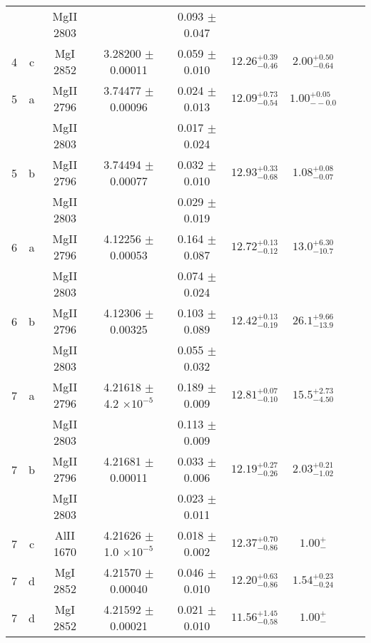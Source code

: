 \documentclass[12pt]{article}
\begin{document}
\begin{footnotesize}
\begin{longtable}{ c c c c c c c c c}
  &   & MgII     2803  &  &  0.093 $\pm$ 0.047   &   &     & 	 & \\ 
       4  & c  & MgI     2852  &  3.28200 $\pm$ 0.00011  &  0.059 $\pm$ 0.010   & $12.26_{ - 0.46}^{ + 0.39}$  & $2.00_{ - 0.64}^{ + 0.50}$    & 	 & \\ 
       5  & a  & MgII     2796  &  3.74477 $\pm$ 0.00096  &  0.024 $\pm$ 0.013   & $12.09_{ - 0.54}^{ + 0.73}$  & $1.00_{ - -0.0}^{ + 0.05}$    & 	 & \\ 
  &   & MgII     2803  &  &  0.017 $\pm$ 0.024   &   &     & 	 & \\ 
       5  & b  & MgII     2796  &  3.74494 $\pm$ 0.00077  &  0.032 $\pm$ 0.010   & $12.93_{ - 0.68}^{ + 0.33}$  & $1.08_{ - 0.07}^{ + 0.08}$    & 	 & \\ 
  &   & MgII     2803  &  &  0.029 $\pm$ 0.019   &   &     & 	 & \\ 
       6  & a  & MgII     2796  &  4.12256 $\pm$ 0.00053  &  0.164 $\pm$ 0.087   & $12.72_{ - 0.12}^{ + 0.13}$  & $13.0_{ - 10.7}^{ + 6.30}$    & 	 & \\ 
  &   & MgII     2803  &  &  0.074 $\pm$ 0.024   &   &     & 	 & \\ 
       6  & b  & MgII     2796  &  4.12306 $\pm$ 0.00325  &  0.103 $\pm$ 0.089   & $12.42_{ - 0.19}^{ + 0.13}$  & $26.1_{ - 13.9}^{ + 9.66}$    & 	 & \\ 
  &   & MgII     2803  &  &  0.055 $\pm$ 0.032   &   &     & 	 & \\ 
       7  & a  & MgII     2796  &  4.21618 $\pm$ 4.2 $\times 10^{-5}$   &  0.189 $\pm$ 0.009   & $12.81_{ - 0.10}^{ + 0.07}$  & $15.5_{ - 4.50}^{ + 2.73}$    & 	 & \\ 
  &   & MgII     2803  &  &  0.113 $\pm$ 0.009   &   &     & 	 & \\ 
       7  & b  & MgII     2796  &  4.21681 $\pm$ 0.00011  &  0.033 $\pm$ 0.006   & $12.19_{ - 0.26}^{ + 0.27}$  & $2.03_{ - 1.02}^{ + 0.21}$    & 	 & \\ 
  &   & MgII     2803  &  &  0.023 $\pm$ 0.011   &   &     & 	 & \\ 
       7  & c  & AlII     1670  &  4.21626 $\pm$ 1.0 $\times 10^{-5}$   &  0.018 $\pm$ 0.002   & $12.37_{ - 0.86}^{ + 0.70}$  & $1.00_{ -  }^{ +  }$    & 	 & \\ 
       7  & d  & MgI     2852  &  4.21570 $\pm$ 0.00040  &  0.046 $\pm$ 0.010   & $12.20_{ - 0.86}^{ + 0.63}$  & $1.54_{ - 0.24}^{ + 0.23}$    & 	 & \\ 
       7  & d  & MgI     2852  &  4.21592 $\pm$ 0.00021  &  0.021 $\pm$ 0.010   & $11.56_{ - 0.58}^{ + 1.45}$  & $1.00_{ -  }^{ +  }$    & 	 & \\ 

\end{longtable}
\end{footnotesize}
\end{document}
